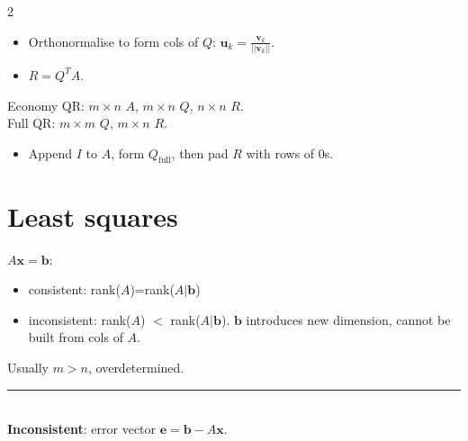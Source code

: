 \documentclass[10pt]{article}
\begin{document}
\begin{multicols*}{2}
{{\begin{itemize}
            \item Orthonormalise to form cols of $Q$: $\mathbf{u}_k = \frac{\mathbf{v}_k}{||\mathbf{v}_k||}$.
            \item $R = Q^T A$.
        \end{itemize}
        Economy QR: $m \times n$ $A$, $m \times n$ $Q$, $n \times n$ $R$.\\
        Full QR: $m \times m$ $Q$, $m \times n$ $R$.
        \begin{itemize}
            \item Append $I$ to $A$, form $Q_{\text{full}}$, then pad $R$ with rows of 0s.
        \end{itemize}
    }%
}

\section*{Least squares}
$A\mathbf{x} = \mathbf{b}$:
\begin{itemize}
    \item consistent: rank($A$)=rank($A|\mathbf{b}$)
    \item inconsistent: rank($A$) $<$ rank($A|\mathbf{b}$).
    $\mathbf{b}$ introduces new dimension, cannot be built from cols of $A$.
\end{itemize}
Usually $m > n$, overdetermined.\\[-6pt]
\rule{\linewidth}{0.4pt}\\[-3pt]
\textbf{Inconsistent}: error vector $\mathbf{e} = \mathbf{b} - A\mathbf{x}$.
\noindent
{}
\end{multicols*}
\end{document}

